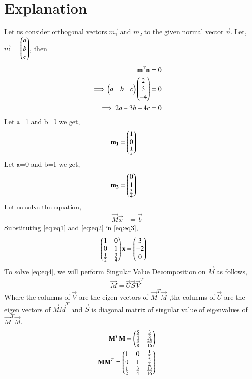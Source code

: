 \documentclass[journal,12pt,twocolumn]{IEEEtran}
\begin{document}
\section{Explanation}
Let us consider orthogonal vectors $\vec{m_1}$ and $\vec{m_2}$ to the given normal vector $\vec{n}$. Let, $\vec{m}$ = $\begin{pmatrix}a\\b\\c\end{pmatrix}$, then
\begin{align}
\mathbf{m^T}\mathbf{n} &= 0\\
\implies\begin{pmatrix}a&b&c\end{pmatrix}\begin{pmatrix}2\\3\\-4\end{pmatrix} &= 0\\
\implies2a+3b-4c &= 0
\end{align}
Let a=1 and b=0 we get,
\begin{align}
\mathbf{m_1} &= \begin{pmatrix}1\\0\\\frac{1}{2}\end{pmatrix} \label{eq:eq1}
\end{align}
Let a=0 and b=1 we get,
\begin{align}
\mathbf{m_2} &= \begin{pmatrix}0\\1\\\frac{3}{4}\end{pmatrix} \label{eq:eq2}
\end{align}
Let us solve the equation,
\begin{align}
\vec{M}\vec{x} &= \vec{b}\label{eq:eq3}
\end{align}
Substituting \eqref{eq:eq1} and \eqref{eq:eq2} in \eqref{eq:eq3},
\begin{align}
    \begin{pmatrix}1&0\\0&1\\\frac{1}{2}&\frac{3}{4}\end{pmatrix}\mathbf{x} &= \begin{pmatrix}3\\-2\\0\end{pmatrix}\label{eq:eq4}
\end{align}
To solve \eqref{eq:eq4}, we will perform Singular Value Decomposition on $\vec{M}$ as follows,
\begin{align}
\vec{M}=\vec{U}\vec{S}\vec{V}^T\label{eq:eq5}
\end{align}
Where the columns of $\vec{V}$ are the eigen vectors of $\vec{M}^T\vec{M}$ ,the columns of $\vec{U}$ are the eigen vectors of $\vec{M}\vec{M}^T$ and $\vec{S}$ is diagonal matrix of singular value of eigenvalues of $\vec{M}^T\vec{M}$.
\begin{align}
\mathbf{M}^T\mathbf{M}=\begin{pmatrix}\frac{5}{4}&\frac{3}{8}\\\frac{3}{8}&\frac{25}{16}\end{pmatrix}\label{eq:eq6}\\
\mathbf{M}\mathbf{M}^T=\begin{pmatrix}1&0&\frac{1}{2}\\0&1&\frac{3}{4}\\\frac{1}{2}&\frac{3}{4}&\frac{13}{16}\end{pmatrix}
\end{align}
\end{document}
